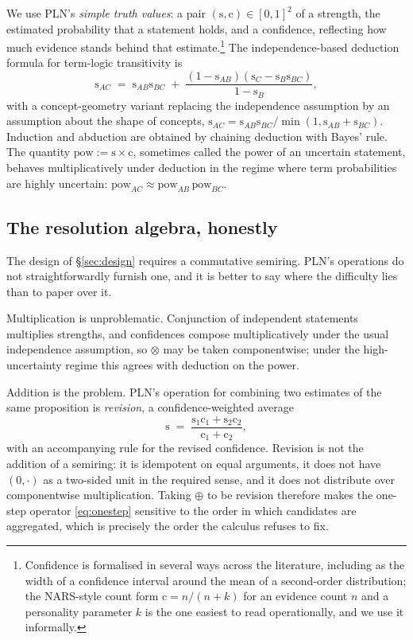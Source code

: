 \documentclass[11pt,a4paper]{article}
\theoremstyle{plain}
\theoremstyle{definition}
\theoremstyle{remark}
\newcommand{\tensorv}{\otimes}
\newcommand{\sumv}{\oplus}
\newcommand{\pow}{\mathrm{pow}}
\newcommand{\str}{\mathrm{s}}
\newcommand{\conf}{\mathrm{c}}
\begin{document}
We use PLN's \emph{simple truth values}: a pair $(\str,\conf) \in [0,1]^2$ of a
strength, the estimated probability that a statement holds, and a confidence,
reflecting how much evidence stands behind that estimate.\footnote{Confidence is
formalised in several ways across the literature, including as the width of a
confidence interval around the mean of a second-order distribution; the
NARS-style count form $\conf = n/(n+k)$ for an evidence count $n$ and a personality
parameter $k$ is the one easiest to read operationally, and we use it
informally.} The independence-based deduction formula for term-logic transitivity
is
\[
  \str_{AC} \;=\; \str_{AB}\str_{BC}
  \;+\; \frac{(1-\str_{AB})(\str_C - \str_B \str_{BC})}{1 - \str_B},
\]
with a concept-geometry variant replacing the independence assumption by an
assumption about the shape of concepts,
$\str_{AC} = \str_{AB}\str_{BC} / \min(1, \str_{AB}+\str_{BC})$. Induction and
abduction are obtained by chaining deduction with Bayes' rule. The quantity
$\pow := \str \times \conf$, sometimes called the power of an uncertain
statement, behaves multiplicatively under deduction in the regime where term
probabilities are highly uncertain: $\pow_{AC} \approx \pow_{AB}\,\pow_{BC}$.

\subsection{The resolution algebra, honestly}

The design of \S\ref{sec:design} requires a commutative semiring. PLN's
operations do not straightforwardly furnish one, and it is better to say where
the difficulty lies than to paper over it.

Multiplication is unproblematic. Conjunction of independent statements
multiplies strengths, and confidences compose multiplicatively under the usual
independence assumption, so $\tensorv$ may be taken componentwise; under the
high-uncertainty regime this agrees with deduction on the power.

Addition is the problem. PLN's operation for combining two estimates of the same
proposition is \emph{revision}, a confidence-weighted average
\[
  \str \;=\; \frac{\str_1\conf_1 + \str_2\conf_2}{\conf_1+\conf_2},
\]
with an accompanying rule for the revised confidence. Revision is not the
addition of a semiring: it is idempotent on equal arguments, it does not have
$(0,\cdot)$ as a two-sided unit in the required sense, and it does not distribute
over componentwise multiplication. Taking $\sumv$ to be revision therefore makes
the one-step operator \eqref{eq:onestep} sensitive to the order in which
candidates are aggregated, which is precisely the order the calculus refuses to
fix.
\end{document}
